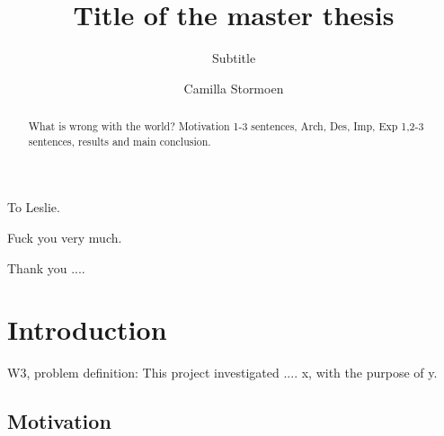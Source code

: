 \documentclass[USenglish]{uit-thesis}
\begin{document}

\title{Title of the master thesis}
\subtitle{Subtitle}			%
\author{Camilla Stormoen}

\maketitle

\frontmatter

\begin{dedication}
To Leslie.

Fuck you very much.
\end{dedication}

\begin{epigraph}
\end{epigraph}

\begin{abstract}
What is wrong with the world? Motivation 1-3 sentences, Arch, Des, Imp, Exp 1,2-3 sentences, results and main conclusion.
\end{abstract}

\begin{acknowledgement}
Thank you ....
\end{acknowledgement}

\tableofcontents

\listofdefinition

\mainmatter

\chapter{Introduction}
W3, problem definition: This project investigated .... x, with the purpose of y.

\section{Motivation}
\end{document}
